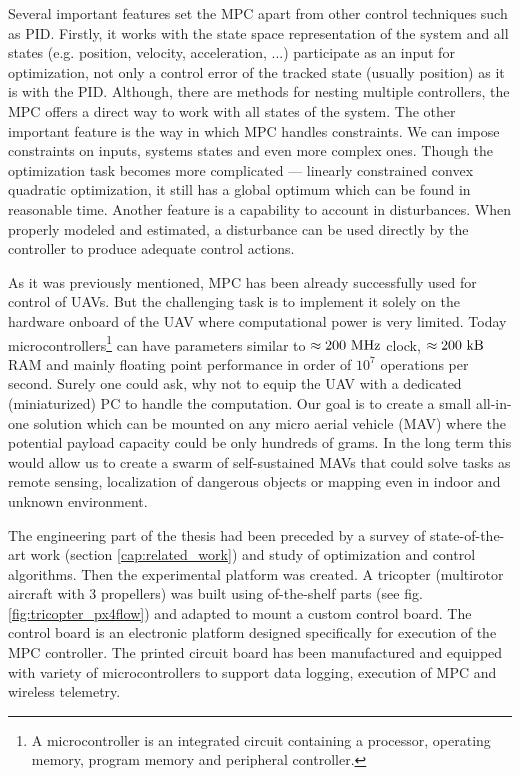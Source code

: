 Several important features set the MPC apart from other control techniques such as PID. Firstly, it works with the state space representation of the system and all states (e.g. position, velocity, acceleration, ...) participate as an input for optimization, not only a control error of the tracked state (usually position) as it is with the PID. Although, there are methods for nesting multiple controllers, the MPC offers a direct way to work with all states of the system. The other important feature is the way in which MPC handles constraints. We can impose constraints on inputs, systems states and even more complex ones. Though the optimization task becomes more complicated --- linearly constrained convex quadratic optimization, it still has a global optimum which can be found in reasonable time. Another feature is a capability to account in disturbances. When properly modeled and estimated, a disturbance can be used directly by the controller to produce adequate control actions.

As it was previously mentioned, MPC has been already successfully used for control of UAVs. But the challenging task is to implement it solely on the hardware onboard of the UAV where computational power is very limited. Today microcontrollers\footnote{A microcontroller is an integrated circuit containing a processor, operating memory, program memory and peripheral controller.} can have parameters similar to $\approx 200 ~\mathrm{MHz}$ clock, $\approx 200 ~\mathrm{kB}$ RAM and mainly floating point performance in order of $10^7$ operations per second. Surely one could ask, why not to equip the UAV with a dedicated (miniaturized) PC to handle the computation. Our goal is to create a small all-in-one solution which can be mounted on any micro aerial vehicle (MAV) where the potential payload capacity could be only hundreds of grams. In the long term this would allow us to create a swarm of self-sustained MAVs that could solve tasks as remote sensing, localization of dangerous objects or mapping even in indoor and unknown environment.

The engineering part of the thesis had been preceded by a survey of state-of-the-art work (section \ref{cap:related_work}) and study of optimization and control algorithms. Then the experimental platform was created. A tricopter (multirotor aircraft with 3 propellers) was built using of-the-shelf parts (see fig. \ref{fig:tricopter_px4flow}) and adapted to mount a custom control board. The control board is an electronic platform designed specifically for execution of the MPC controller. The printed circuit board has been manufactured and equipped with variety of microcontrollers to support data logging, execution of MPC and wireless telemetry. 


